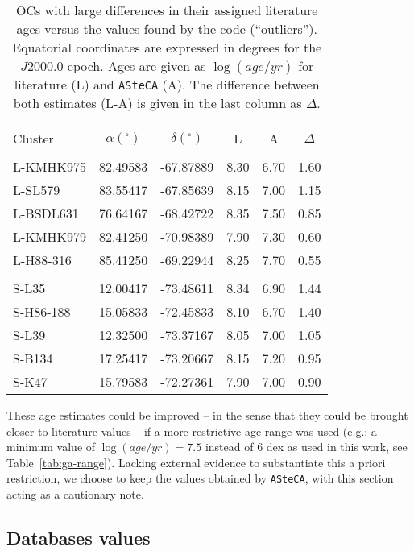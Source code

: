 \documentclass[a4paper,fleqn,usenatbib]{mnras}
\begin{document}
\begin{table}
\centering
\caption{OCs with large differences in their assigned literature ages versus
the values found by the code (``outliers'').
Equatorial coordinates are expressed in degrees for the $J2000.0$ epoch.
Ages are given as $\log(age/yr)$ for literature (L) and \texttt{ASteCA} (A).
The difference between both estimates (L-A) is given in the last column as
$\Delta$.}
\label{tab:outliers}
\begin{tabular}{lccccc}
\hline
\hline\\[-1.85ex]
Cluster & $\alpha(^\circ)$ & $\delta(^\circ)$ & L & A & $\Delta$\\
\hline\\[-1.85ex]
L-KMHK975 & 82.49583 & -67.87889 & 8.30 & 6.70 & 1.60\\
L-SL579 & 83.55417 & -67.85639 & 8.15 & 7.00 & 1.15\\
L-BSDL631 & 76.64167 & -68.42722 & 8.35 & 7.50 & 0.85\\
L-KMHK979 & 82.41250 & -70.98389 & 7.90 & 7.30 & 0.60\\
L-H88-316 & 85.41250 & -69.22944 & 8.25 & 7.70 & 0.55\\
\\[-1.85ex]
S-L35 & 12.00417 & -73.48611 & 8.34 & 6.90 & 1.44\\
S-H86-188 & 15.05833 & -72.45833 & 8.10 & 6.70 & 1.40\\
S-L39 & 12.32500 & -73.37167 & 8.05 & 7.00 & 1.05\\
S-B134 & 17.25417 & -73.20667 & 8.15 & 7.20 & 0.95\\
S-K47 & 15.79583 & -72.27361 & 7.90 & 7.00 & 0.90\\
\end{tabular}
\end{table}


These age estimates could be improved -- in the sense that they could
be brought closer to literature values -- if a more restrictive age range was
used (e.g.: a minimum value of $\log(age/yr){=}7.5$ instead of 6 dex as used in
this work, see Table~\ref{tab:ga-range}).
Lacking external evidence to substantiate this a priori restriction, we choose
to keep the values obtained by \texttt{ASteCA}, with this section acting as a
cautionary note.



\subsection{Databases values}
\label{ssec:db-values}
\end{document}
